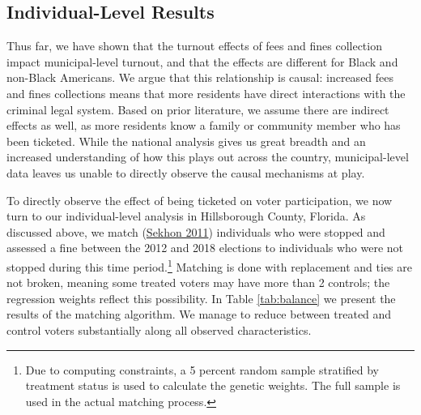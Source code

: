 \documentclass[
  12pt,
]{article}
\begin{document}
\hypertarget{individual-level-results}{%
\subsection*{Individual-Level Results}\label{individual-level-results}}

Thus far, we have shown that the turnout effects of fees and fines collection impact municipal-level turnout, and that the effects are different for Black and non-Black Americans. We argue that this relationship is causal: increased fees and fines collections means that more residents have direct interactions with the criminal legal system. Based on prior literature, we assume there are indirect effects as well, as more residents know a family or community member who has been ticketed. While the national analysis gives us great breadth and an increased understanding of how this plays out across the country, municipal-level data leaves us unable to directly observe the causal mechanisms at play.

To directly observe the effect of being ticketed on voter participation, we now turn to our individual-level analysis in Hillsborough County, Florida. As discussed above, we match (\protect\hyperlink{ref-Sekhon2011}{Sekhon 2011}) individuals who were stopped and assessed a fine between the 2012 and 2018 elections to individuals who were not stopped during this time period.\footnote{Due to computing constraints, a 5 percent random sample stratified by treatment status is used to calculate the genetic weights. The full sample is used in the actual matching process.} Matching is done with replacement and ties are not broken, meaning some treated voters may have more than 2 controls; the regression weights reflect this possibility. In Table \ref{tab:balance} we present the results of the matching algorithm. We manage to reduce between treated and control voters substantially along all observed characteristics.
\end{document}

